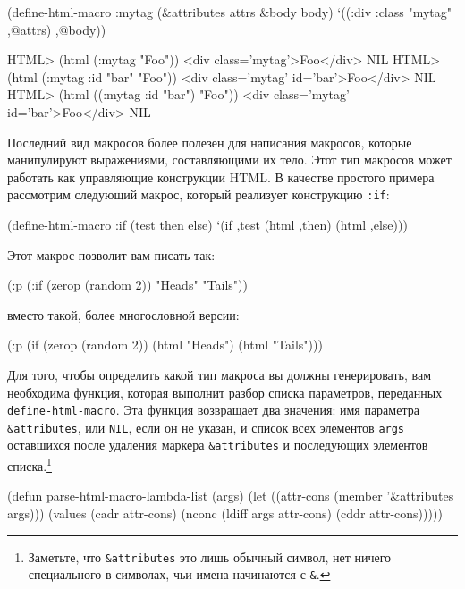 \begin{myverb}
(define-html-macro :mytag (&attributes attrs &body body)
  `((:div :class "mytag" ,@attrs) ,@body))
\end{myverb}

\begin{myverb}
HTML> (html (:mytag "Foo"))
<div class='mytag'>Foo</div>
NIL
HTML> (html (:mytag :id "bar" "Foo"))
<div class='mytag' id='bar'>Foo</div>
NIL
HTML> (html ((:mytag :id "bar") "Foo"))
<div class='mytag' id='bar'>Foo</div>
NIL
\end{myverb}

Последний вид макросов более полезен для написания макросов, которые манипулируют
выражениями, составляющими их тело.  Этот тип макросов может работать как управляющие
конструкции HTML. В качестве простого примера рассмотрим следующий макрос, который
реализует конструкцию \lstinline{:if}:

\begin{myverb}
(define-html-macro :if (test then else)
  `(if ,test (html ,then) (html ,else)))
\end{myverb}

Этот макрос позволит вам писать так:

\begin{myverb}
(:p (:if (zerop (random 2)) "Heads" "Tails"))
\end{myverb}

вместо такой, более многословной версии:

\begin{myverb}
(:p (if (zerop (random 2)) (html "Heads") (html "Tails")))
\end{myverb}

Для того, чтобы определить какой тип макроса вы должны генерировать, вам необходима
функция, которая выполнит разбор списка параметров, переданных \lstinline{define-html-macro}.
Эта функция возвращает два значения: имя параметра \lstinline!&attributes!, или
\lstinline{NIL}, если он не указан, и список всех элементов \lstinline{args} оставшихся после
удаления маркера \lstinline!&attributes! и последующих элементов
списка.\footnote{Заметьте, что \lstinline!&attributes! это лишь обычный символ, нет ничего
  специального в символах, чьи имена начинаются с \lstinline!&!.}

\begin{myverb}
(defun parse-html-macro-lambda-list (args)
  (let ((attr-cons (member '&attributes args)))
    (values 
     (cadr attr-cons)
     (nconc (ldiff args attr-cons) (cddr attr-cons)))))
\end{myverb}

